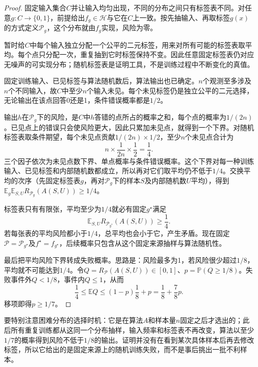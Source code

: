 \begin{proof}
固定输入集合$C$并让输入均匀出现，不同的分布之间只有标签表不同。对任意$g:C\to\{0,1\}$，前提给出$f_g\in\mathcal H$与它在$C$上一致。按先抽输入、再取标签$g(x)$的方式定义$\mathcal P_g$，这个分布就由$f_g$实现，风险为零。

暂时给$C$中每个输入独立分配一个公平的二元标签，用来对所有可能的标签表取平均。每个点只分配一次，重复抽到它时标签保持不变。因此任意固定标签表仍对应无噪声的可实现分布；随机标签表是证明工具，不是训练过程中不断变化的真值。

固定训练输入、已见标签与算法随机数后，算法输出也已确定。$n$个观测至多涉及$n$个不同输入，故$C$中至少$n$个输入未见。每个未见标签仍是独立公平的二元选择，无论输出在该点回答0还是1，条件错误概率都是$1/2$。

输出$h$在$\mathcal P_g$下的风险，是$C$中$h$答错的点所占的概率之和，每个点的概率为$1/(2n)$。已见点上的错误只会使风险更大，因此只累加未见点，就得到一个下界。对随机标签表取条件期望，每个未见点贡献$1/(2n)\times1/2$，至少$n$个未见点合计为
\begin{equation}
 n\times\frac1{2n}\times\frac12=\frac14.
 \label{eq:no-free-lunch-expected-risk}
\end{equation}
三个因子依次为未见点数下界、单点概率与条件错误概率。这个下界对每一种训练输入、已见标签和内部随机数都成立，所以再对它们取平均仍不低于$1/4$。交换平均的次序（先固定标签表$g$，再对$\mathcal P_g$下的样本$S$及内部随机数$U$平均），得到$\mathbb E_g\mathbb E_{S,U}R_{\mathcal P_g}(A(S,U))\geq1/4$。

标签表只有有限张，平均至少为$1/4$就必有固定$g^\star$满足
\[
 \mathbb E_{S,U}R_{\mathcal P_{g^\star}}(A(S,U))\geq\frac14.
\]
若每张表的平均风险都小于$1/4$，总平均也会小于它，产生矛盾。现在固定$\mathcal P=\mathcal P_{g^\star}$及$f^\star=f_{g^\star}$，后续概率只包含从这个固定来源抽样与算法随机性。

最后把平均风险下界转成失败概率。思路是：风险最多为1，若风险很少超过$1/8$，平均就不可能达到$1/4$。令$Q=R_{\mathcal P}(A(S,U))\in[0,1]$、$p=\mathbb P(Q\geq1/8)$。失败事件外$Q<1/8$，事件内$Q\leq1$，从而
\[
 \frac14\leq\mathbb E Q\leq(1-p)\frac18+p
 =\frac18+\frac78p.
\]
移项即得$p\geq1/7$。\end{proof}

要特别注意困难分布的选择时机：它是在算法$A$和样本量$n$固定之后才选出的；此后所有重复训练都从这同一个分布抽样，输入频率和标签表不再改变，算法以至少$1/7$的概率得到风险不低于$1/8$的输出。证明并没有在看到某次具体样本后再去修改标签，所以它给出的是固定来源上的随机训练失败，而不是事后挑出一批不利样本。

